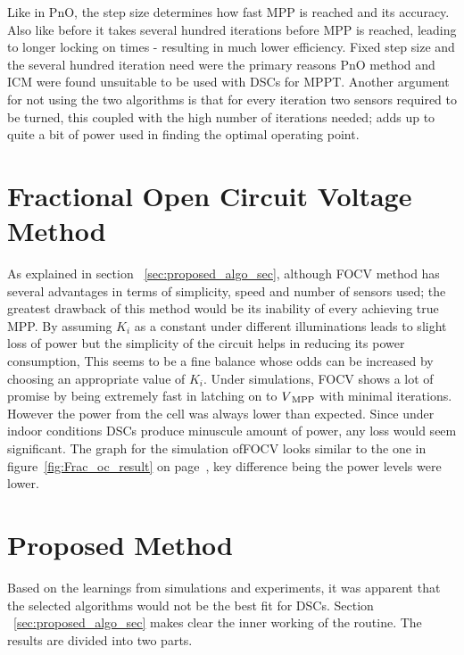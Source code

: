  Like in \ac{PnO}, the step size determines how fast \ac{MPP} is reached and its accuracy. Also like before it takes several hundred iterations before \ac{MPP} is reached, leading to longer locking on times - resulting in much lower efficiency. Fixed step size and the several hundred iteration need were the primary reasons \ac{PnO} method and \ac{ICM} were found unsuitable to be used with \ac{DSCs} for \ac{MPPT}. Another argument for not using the two algorithms is that for every iteration two sensors required to be turned, this coupled with the high number of iterations needed; adds up to quite a bit of power used in finding the optimal operating point.             
 
         
 \section{Fractional Open Circuit Voltage Method }
 
As explained in section ~\ref{sec:proposed_algo_sec}, although \ac{FOCV} method has several advantages in terms of simplicity, speed and number of sensors used; the greatest drawback of this method would be its inability of every achieving true \ac{MPP}. By assuming $K_{i}$ as a constant under different illuminations leads to slight loss of power but the simplicity of the circuit helps in reducing its power consumption, This seems to be a fine balance whose odds can be increased by choosing an appropriate value of $K_{i}$. Under simulations, \ac{FOCV} shows a lot of promise by being extremely fast in latching on to $V\textsubscript{MPP}$ with minimal iterations. However the power from the cell was always lower than expected. Since under indoor conditions \ac{DSCs} produce minuscule amount of power, any loss would seem significant. The graph for the simulation of\ac{FOCV} looks similar to the one in figure~\ref{fig:Frac_oc_result} on page~\pageref{fig:Frac_oc_result}, key difference being the power levels were lower.             

\section{Proposed Method }

Based on the learnings from simulations and experiments, it was apparent that the selected algorithms would not be the best fit for \ac{DSCs}. Section ~\ref{sec:proposed_algo_sec} makes clear the inner working of the routine. The results are divided into two parts.\\
	
